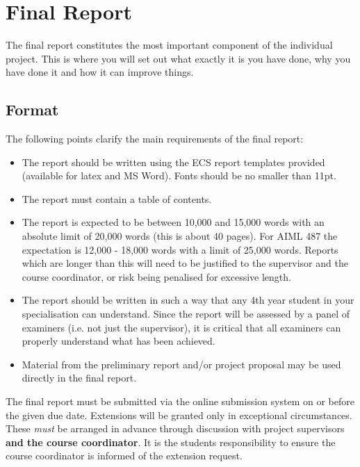 \chapter{Final Report}
The final report constitutes the most important component of the
individual project.  This is where you will set out what exactly it is
you have done, why you have done it and how it can improve things.


\section{Format}
The following points clarify the main requirements of the final
report:
\begin{itemize}
\item The report should be written using the ECS report templates
  provided (available for latex and MS Word).  Fonts should be no
  smaller than 11pt.
\item The report must contain a table of contents.
\item The report is expected to be between 10,000 and 15,000 words with an 
absolute limit of 20,000 words (this is about 40 pages). For AIML 487 the expectation is 12,000 - 18,000 words with a limit of 25,000 words. 
Reports which are longer than this will need to be justified to the
supervisor and the course coordinator, or risk being penalised for
excessive length.

\item The report should be written in such a way that any 4th year student in your specialisation
  can understand.  Since the report will be assessed by a panel of
  examiners (i.e. not just the supervisor), it is critical that all
  examiners can properly understand what has been achieved.

\item Material from the preliminary report and/or project proposal may be
  used directly in the final report.
\end{itemize}
The final report must be submitted via the online submission system on or
before the given due date. Extensions will be granted only in exceptional circumstances. These
\emph{must} be arranged in advance through discussion with project supervisors
{\bf and the course coordinator}. It is the students responsibility to ensure the course coordinator is informed of the extension request. 

